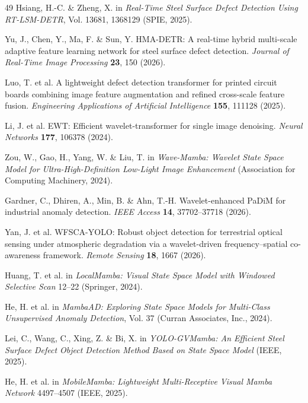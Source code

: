 \documentclass[pdflatex,sn-nature]{sn-jnl}
\begin{document}
\begin{thebibliography}{49}
Hsiang, H.-C. \& Zheng, X. in \textit{Real-Time Steel Surface Defect Detection Using RT-LSM-DETR}, Vol. 13681, 1368129 (SPIE, 2025).

Yu, J., Chen, Y., Ma, F. \& Sun, Y. HMA-DETR: A real-time hybrid multi-scale adaptive feature learning network for steel surface defect detection. \textit{Journal of Real-Time Image Processing} \textbf{23}, 150 (2026).

Luo, T. et al. A lightweight defect detection transformer for printed circuit boards combining image feature augmentation and refined cross-scale feature fusion. \textit{Engineering Applications of Artificial Intelligence} \textbf{155}, 111128 (2025).

Li, J. et al. EWT: Efficient wavelet-transformer for single image denoising. \textit{Neural Networks} \textbf{177}, 106378 (2024).

Zou, W., Gao, H., Yang, W. \& Liu, T. in \textit{Wave-Mamba: Wavelet State Space Model for Ultra-High-Definition Low-Light Image Enhancement} (Association for Computing Machinery, 2024).

Gardner, C., Dhiren, A., Min, B. \& Ahn, T.-H. Wavelet-enhanced PaDiM for industrial anomaly detection. \textit{IEEE Access} \textbf{14}, 37702--37718 (2026).

Yan, J. et al. WFSCA-YOLO: Robust object detection for terrestrial optical sensing under atmospheric degradation via a wavelet-driven frequency--spatial co-awareness framework. \textit{Remote Sensing} \textbf{18}, 1667 (2026).

Huang, T. et al. in \textit{LocalMamba: Visual State Space Model with Windowed Selective Scan} 12--22 (Springer, 2024).

He, H. et al. in \textit{MambaAD: Exploring State Space Models for Multi-Class Unsupervised Anomaly Detection}, Vol. 37 (Curran Associates, Inc., 2024).

Lei, C., Wang, C., Xing, Z. \& Bi, X. in \textit{YOLO-GVMamba: An Efficient Steel Surface Defect Object Detection Method Based on State Space Model} (IEEE, 2025).

He, H. et al. in \textit{MobileMamba: Lightweight Multi-Receptive Visual Mamba Network} 4497--4507 (IEEE, 2025).


\end{thebibliography}
\end{document}
